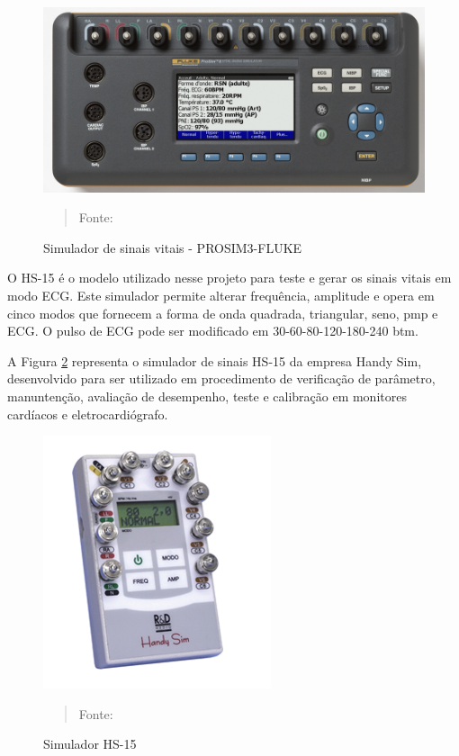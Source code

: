 \documentclass[12pt, a4paper]{article}
\begin{document}
\begin{figure}[H]
\begin{center}
			\caption{Simulador de sinais vitais - PROSIM3-FLUKE}
			\includegraphics[width=.4\textwidth]{Figuras/fluke.png}
			\vspace*{\fill} 
            \begin{quote} 
            \centering 
           Fonte: \cite{fluke}
            \end{quote}
            \vspace*{\fill}
			\label{fig:simvitais}
\end{center}
\end{figure}

O HS-15 é o modelo utilizado nesse projeto para teste e gerar os sinais vitais em modo ECG. Este simulador permite alterar frequência, amplitude e opera  em cinco modos que fornecem a forma de onda quadrada, triangular, seno, pmp e ECG.  O pulso de ECG pode ser modificado em 30-60-80-120-180-240 btm. 
	

A Figura \ref{fig:hs15} representa o simulador de sinais HS-15 da empresa Handy Sim, desenvolvido para ser utilizado em procedimento de verificação de parâmetro, manuntenção, avaliação de desempenho, teste e calibração em monitores cardíacos e eletrocardiógrafo. 
 


\begin{figure}[H]
\begin{center}
			\caption{Simulador HS-15}
			\includegraphics[width=.4\textwidth]{Figuras/HS150.PNG}
			\vspace*{\fill} 
            \begin{quote} 
            \centering 
           Fonte: \cite{HS15}
            \end{quote}
            \vspace*{\fill}
			\label{fig:hs15}
  
\end{center}
\end{figure}
\end{document}
